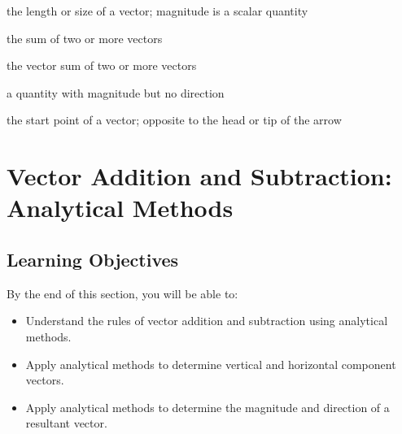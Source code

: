 \documentclass[
]{book}
\providecommand{\tightlist}{%
  \setlength{\itemsep}{0pt}\setlength{\parskip}{0pt}}
\begin{document}
\begin{description}
\tightlist
\item[magnitude (of a vector)]
the length or size of a vector; magnitude is a scalar quantity
\end{description}

\begin{description}
\tightlist
\item[resultant]
the sum of two or more vectors
\end{description}

\begin{description}
\tightlist
\item[resultant vector]
the vector sum of two or more vectors
\end{description}

\begin{description}
\tightlist
\item[scalar]
a quantity with magnitude but no direction
\end{description}

\begin{description}
\tightlist
\item[tail]
the start point of a vector; opposite to the head or tip of the
arrow
\end{description}

\hypertarget{vector-addition-and-subtraction-analytical-methods}{%
\section{Vector Addition and Subtraction: Analytical Methods}\label{vector-addition-and-subtraction-analytical-methods}}

\hypertarget{fs-id1468448}{}
\hypertarget{learning-objectives-9}{%
\subsection{Learning Objectives}\label{learning-objectives-9}}

By the end of this section, you will be able to:

\begin{itemize}
\tightlist
\item
  Understand the rules of vector addition and subtraction using
  analytical methods.
\item
  Apply analytical methods to determine vertical and horizontal
  component vectors.
\item
  Apply analytical methods to determine the magnitude and direction of
  a resultant vector.
\end{itemize}
\end{document}
